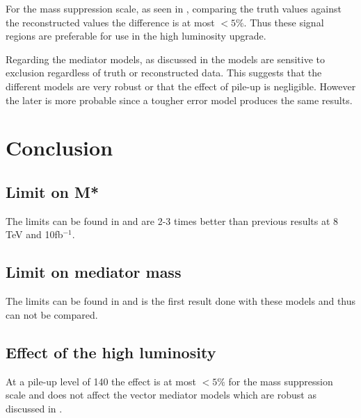For the mass suppression scale, as seen in , comparing the truth values against the reconstructed values the difference is at most $<5 \% $. Thus these signal regions are preferable for use in the high luminosity upgrade. 

Regarding the mediator models, as discussed in  the models are sensitive to exclusion regardless of truth or reconstructed data. This suggests that the different models are very robust or that the effect of pile-up is negligible. However the later is more probable since a tougher error model produces the same results.

\newpage
\section{Conclusion}
\subsection{Limit on M*}
The limits can be found in  and are 2-3 times better than previous results at 8 TeV and 10fb$^{-1}$.

\subsection{Limit on mediator mass}
The limits can be found in  and is the first result done with these models and thus can not be compared.

\subsection{Effect of the high luminosity}
At a pile-up level of 140 the effect is at most $<5\%$ for the mass suppression scale and does not affect the vector mediator models which are robust as discussed in .